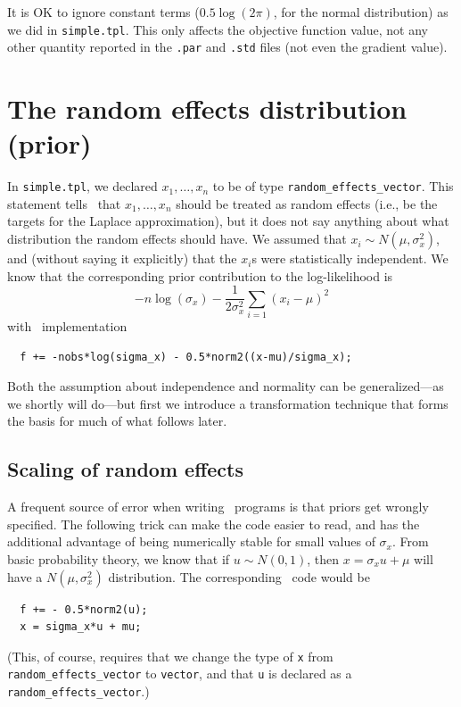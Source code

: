 \documentclass{admbmanual}
\begin{document}
It is OK to ignore constant terms ($0.5\log(2\pi)$, for the normal distribution)
as we did in \texttt{simple.tpl}. This only affects the objective function
value, not any other quantity reported in the \texttt{.par} and \texttt{.std}
files (not even the gradient value).

\section{The random effects distribution (prior)}

In \texttt{simple.tpl}, we declared $x_{1},\ldots ,x_{n}$ to be of type
\texttt{random\_effects\_vector}. This statement tells \scAB\ that $x_{1},\ldots
,x_{n}$ should be treated as random effects (i.e., be the targets for the
Laplace approximation), but it does not say anything about what distribution the
random effects should have. We assumed that $x_i\sim N(\mu ,\sigma_{x}^{2})$,
and (without saying it explicitly) that the $x_i$s were statistically
independent. We know that the corresponding prior contribution to the
log-likelihood is
\[
-n\log (\sigma_{x})-\frac{1}{2\sigma_x^2}\sum_{i=1}\left( x_i-\mu \right) ^{2}
\]
with \scAB\ implementation
\begin{lstlisting}
  f += -nobs*log(sigma_x) - 0.5*norm2((x-mu)/sigma_x);
\end{lstlisting}
Both the assumption about independence and normality can be generalized---as we
shortly will do---but first we introduce a transformation technique that forms
the basis for much of what follows later.

\subsection{Scaling of random effects}

A frequent source of error when writing \scAR\ programs is that priors get
wrongly specified. The following trick can make the code easier to read, and has
the additional advantage of being numerically stable for small values of
$\sigma_{x}$. From basic probability theory, we know that if $u\sim N(0,1)$,
then $x=\sigma_{x}u+\mu$ will have a $N(\mu ,\sigma_{x}^{2})$ distribution. The
corresponding \scAB\ code would be
\begin{lstlisting}
  f += - 0.5*norm2(u);
  x = sigma_x*u + mu;
\end{lstlisting}
(This, of course, requires that we change the type of \texttt{x} from
\texttt{random\_effects\_vector} to \texttt{vector}, and that \texttt{u} is
declared as a \texttt{random\_effects\_vector}.)
\end{document}
